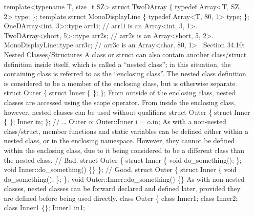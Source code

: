 template\textless typename T, size\_t SZ\textgreater{} struct TwoDArray
\{ typedef Array\textless T, SZ, 2\textgreater{} type; \}; template
struct MonoDisplayLine \{ typedef Array\textless T, 80, 1\textgreater{}
type; \}; OneDArray\textless int, 3\textgreater::type arr1i; // arr1i is
an Array\textless int, 3, 1\textgreater. TwoDArray\textless short,
5\textgreater::type arr2s; // arr2s is an Array\textless short, 5,
2\textgreater. MonoDisplayLine::type arr3c; // arr3c is an
Array\textless char, 80, 1\textgreater. Section 34.10: Nested
Classes/Structures A class or struct can also contain another
class/struct deﬁnition inside itself, which is called a ``nested
class''; in this situation, the containing class is referred to as the
``enclosing class''. The nested class deﬁnition is considered to be a
member of the enclosing class, but is otherwise separate. struct Outer
\{ struct Inner \{ \}; \}; From outside of the enclosing class, nested
classes are accessed using the scope operator. From inside the enclosing
class, however, nested classes can be used without qualiﬁers: struct
Outer \{ struct Inner \{ \}; Inner in; \}; // \ldots{} Outer o;
Outer::Inner i = o.in; As with a non-nested class/struct, member
functions and static variables can be deﬁned either within a nested
class, or in the enclosing namespace. However, they cannot be deﬁned
within the enclosing class, due to it being considered to be a diﬀerent
class than the nested class. // Bad. struct Outer \{ struct Inner \{
void do\_something(); \}; void Inner::do\_something() \{\} \}; // Good.
struct Outer \{ struct Inner \{ void do\_something(); \}; \}; void
Outer::Inner::do\_something() \{\} As with non-nested classes, nested
classes can be forward declared and deﬁned later, provided they are
deﬁned before being used directly. class Outer \{ class Inner1; class
Inner2; class Inner1 \{\}; Inner1 in1;
